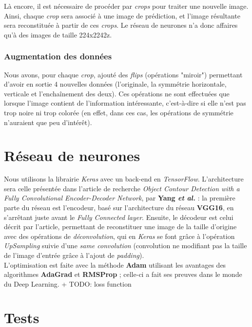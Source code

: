 \documentclass{report}
\begin{document}
Là encore, il est nécessaire de procéder par \textit{crops} pour traiter une nouvelle
image. Ainsi, chaque \textit{crop} sera associé à une image de prédiction,
et l'image résultante sera reconstituée à partir de ces \textit{crops}. Le réseau
de neurones n'a donc affaires qu'à des images de taille 224x2242z.

\subsection{Augmentation des données}

Nous avons, pour chaque \textit{crop}, ajouté des \textit{flips} (opérations "miroir")
permettant d'avoir en sortie 4 nouvelles données (l'originale, la symmétrie horizontale,
verticale et l'enchaînement des deux). Ces opérations ne sont effectuées que lorsque
l'image contient de l'information intéressante, c'est-à-dire si elle n'est pas trop
noire ni trop colorée (en effet, dans ces cas, les opérations de symmétrie n'auraient
que peu d'intérêt).


\chapter{Réseau de neurones}

Nous utilisons la librairie \textit{Keras} avec un back-end en \textit{TensorFlow}.
L'architecture sera celle présentée dans l'article de recherche \textit{Object Contour
Detection with a Fully Convolutional Encoder-Decoder Network}, par \textbf{Yang
\textit{et al.}} : la première parte du réseau est l'encodeur, basé sur l'architecture
du réseau \textbf{VGG16}, en s'arrêtant juste avant le \textit{Fully Connected layer}.
Ensuite, le décodeur est celui décrit par l'article, permettant de reconstituer
une image de la taille d'origine avec des opérations de \textit{déconvolution},
qui en \textit{Keras} se font grâce à l'opération \textit{UpSampling} suivie d'une
\textit{same convolution} (convolution ne modifiant pas la taille de l'image d'entrée
grâce à l'ajout de \textit{padding}). \\
L'optimisation est faite avec la méthode \textbf{Adam} utilisant les avantages des
algorithmes \textbf{AdaGrad} et \textbf{RMSProp}  ; celle-ci a fait ses preuves
dans le monde du Deep Learning.
+ TODO: loss function

\chapter{Tests}
\end{document}
